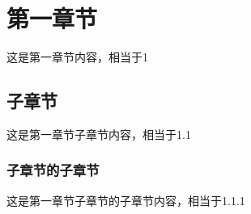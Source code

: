 \documentclass[UTF8]{ctexart}
\begin{document}
\section{第一章节}
这是第一章节内容，相当于1
    \subsection{子章节}
    这是第一章节子章节内容，相当于1.1
        \subsubsection{子章节的子章节}
        这是第一章节子章节的子章节内容，相当于1.1.1
\end{document}
